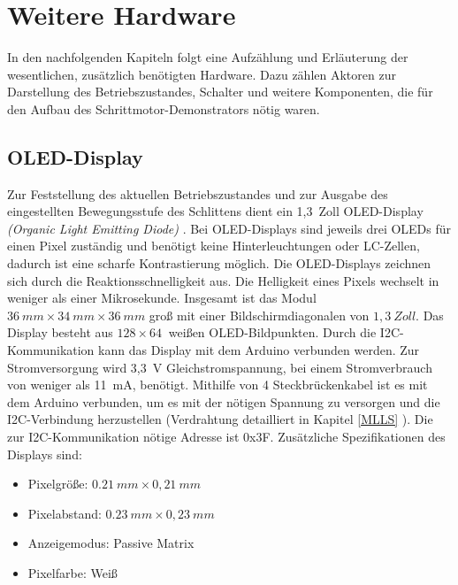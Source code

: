 %
%
%

\chapter{Weitere Hardware}
In den nachfolgenden Kapiteln folgt eine Aufzählung und Erläuterung der wesentlichen, zusätzlich benötigten Hardware. Dazu zählen Aktoren zur Darstellung des Betriebszustandes, Schalter und weitere Komponenten, die für den Aufbau des Schrittmotor-Demonstrators nötig waren.  

\section{OLED-Display}
Zur Feststellung des aktuellen Betriebszustandes und zur Ausgabe des eingestellten Bewegungsstufe des Schlittens dient ein 1,3\ Zoll OLED-Display \emph{(Organic Light Emitting Diode)} . Bei OLED-Displays sind jeweils drei OLEDs für einen Pixel zuständig und benötigt keine Hinterleuchtungen oder LC-Zellen, dadurch ist eine scharfe Kontrastierung möglich. Die OLED-Displays zeichnen sich durch die Reaktionsschnelligkeit aus. Die Helligkeit eines Pixels wechselt in weniger als einer Mikrosekunde.\cite{DieterStotz.2019} Insgesamt ist das Modul $36 \ mm \times 34  \ mm \times36 \ mm$ groß mit einer Bildschirmdiagonalen von $1,3\ Zoll $. Das Display besteht aus $128 \times 64 \ $ weißen OLED-Bildpunkten. Durch die I2C-Kommunikation kann das Display mit dem Arduino verbunden werden. Zur Stromversorgung wird  3,3\ V Gleichstromspannung, bei einem Stromverbrauch von weniger als 11\ mA, benötigt. Mithilfe von 4 Steckbrückenkabel ist es mit dem Arduino verbunden, um es mit der nötigen Spannung zu versorgen und die I2C-Verbindung herzustellen (Verdrahtung detailliert in Kapitel \ref{MLLS} ). Die zur I2C-Kommunikation nötige Adresse ist 0x3F. %
Zusätzliche Spezifikationen des Displays sind: 
	\begin{itemize}
		\item Pixelgröße: $0.21 \ mm \times 0,21 \ mm $
		\item Pixelabstand: $0.23 \ mm \times 0,23 \ mm $
		\item Anzeigemodus: Passive Matrix
		\item Pixelfarbe: Weiß
	\end{itemize}
\cite{AZDelivery.2024}


